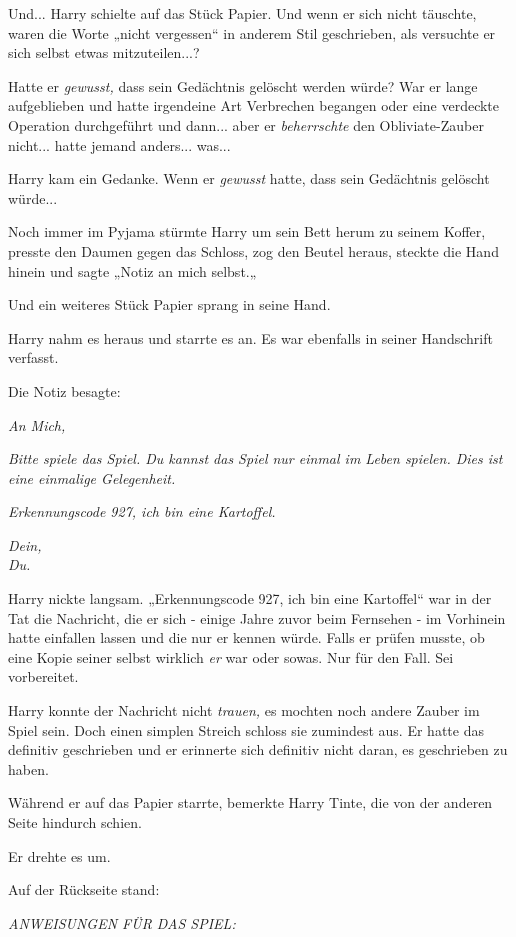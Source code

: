 {Und... Harry schielte auf das Stück Papier. Und wenn er sich nicht täuschte, waren die Worte „nicht vergessen“ in anderem Stil geschrieben, als versuchte er sich selbst etwas mitzuteilen...?

Hatte er \emph{gewusst,} dass sein Gedächtnis gelöscht werden würde? War er lange aufgeblieben und hatte irgendeine Art Verbrechen begangen oder eine verdeckte Operation durchgeführt und dann... aber er \emph{beherrschte} den Obliviate-Zauber nicht... hatte jemand anders... was...

Harry kam ein Gedanke. Wenn er \emph{gewusst} hatte, dass sein Gedächtnis gelöscht würde...

Noch immer im Pyjama stürmte Harry um sein Bett herum zu seinem Koffer, presste den Daumen gegen das Schloss, zog den Beutel heraus, steckte die Hand hinein und sagte „Notiz an mich selbst.„

Und ein weiteres Stück Papier sprang in seine Hand.

Harry nahm es heraus und starrte es an. Es war ebenfalls in seiner Handschrift verfasst.

Die Notiz besagte:

\emph{An Mich,}

\emph{Bitte spiele das Spiel. Du kannst das Spiel nur einmal im Leben spielen. Dies ist eine einmalige Gelegenheit.}

\emph{Erkennungscode 927, ich bin eine Kartoffel.}

\emph{\emph{Dein,\\ Du.}}

Harry nickte langsam. „Erkennungscode 927, ich bin eine Kartoffel“ war in der Tat die Nachricht, die er sich - einige Jahre zuvor beim Fernsehen - im Vorhinein hatte einfallen lassen und die nur er kennen würde. Falls er prüfen musste, ob eine Kopie seiner selbst wirklich \emph{er} war oder sowas. Nur für den Fall. Sei vorbereitet.

Harry konnte der Nachricht nicht \emph{trauen,} es mochten noch andere Zauber im Spiel sein. Doch einen simplen Streich schloss sie zumindest aus. Er hatte das definitiv geschrieben und er erinnerte sich definitiv nicht daran, es geschrieben zu haben.

Während er auf das Papier starrte, bemerkte Harry Tinte, die von der anderen Seite hindurch schien.

Er drehte es um.

Auf der Rückseite stand:

\emph{ANWEISUNGEN FÜR DAS SPIEL:}

}

